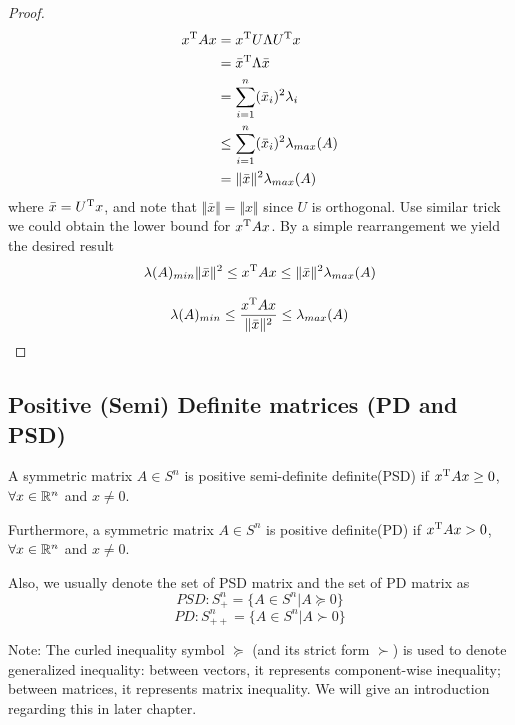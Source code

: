 \begin{proof}
	\begin{align*}
	x^{{\rm T}}Ax &= x^{{\rm T}}U\Lambda U^{{\rm T}}x\\
	&= \bar{x}^{{\rm T}}\Lambda\bar{x}\\
	&= \sum^n_{i=1}(\bar{x}_i)^2\lambda_i\\
	&\leq \sum^n_{i=1}(\bar{x}_i)^2\lambda_{max}(A)\\
	&= \Vert\bar{x}\Vert^2\lambda_{max}(A)
	\end{align*}
where $\bar{x}=U^{{\rm T}}x$, and note that $\Vert \bar{x}\Vert = \Vert {x}\Vert$ since $U$ is orthogonal. Use similar trick we could obtain the lower bound for $x^{{\rm T}}Ax$. By a simple rearrangement we yield the desired result
	\begin{equation*}
	\lambda(A)_{min}\Vert\bar{x}\Vert^2 \leq x^{{\rm T}}Ax \leq \Vert\bar{x}\Vert^2\lambda_{max}(A)
	\end{equation*}
	
	\begin{equation*}
	\lambda(A)_{min} \leq \frac{x^{{\rm T}}Ax}{\Vert\bar{x}\Vert^2} \leq \lambda_{max}(A)
	\end{equation*}
\end{proof}


\subsection{Positive (Semi) Definite matrices (PD and PSD)}

\begin{definition}

	A symmetric matrix $A\in S^n$ is positive semi-definite definite(PSD) if $x^{{\rm T}}Ax \geq 0$, $\forall x\in \mathbb{R}^n$ and $x\neq 0$.

	Furthermore, a symmetric matrix $A\in S^n$ is positive definite(PD) if $x^{{\rm T}}Ax > 0$, $\forall x\in \mathbb{R}^n$ and $x\neq 0$.

\end{definition}

Also, we usually denote the set of PSD matrix and the set of PD matrix as
$$PSD: S^n_{+} = \{A\in S^n \vert A\succeq 0\}$$
$$PD: S^n_{++} = \{A\in S^n \vert A\succ 0\}$$

Note: The curled inequality symbol $\succeq$ (and its strict form $\succ$) is used to denote generalized inequality: between vectors, it represents component-wise inequality; between matrices, it represents matrix inequality. We will give an introduction regarding this in later chapter.

